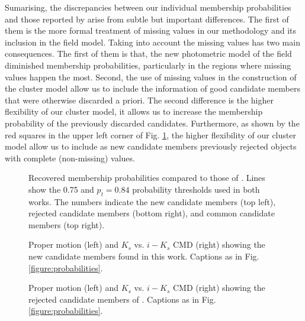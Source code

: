 Sumarising, the discrepancies between our individual membership probabilities and those reported by \citet{Bouy2015} arise from subtle but important differences. The first of them is the more formal treatment of missing values in our methodology and its inclusion in the field model. Taking into account the missing values has two main consequences. The first of them is that, the new photometric model of the field diminished membership probabilities, particularly in the regions where missing values happen the most. Second, the use of missing values in the construction of the cluster model allow us to include the information of good candidate members that were otherwise discarded a priori. The second difference is the higher flexibility of our cluster model, it allows us to increase the membership probability of the previously discarded candidates. Furthermore, as shown by the red squares in the upper left corner of Fig. \ref{figure:HM-SBB}, the higher flexibility of our cluster model allow us to include as new candidate members previously rejected objects with complete (non-missing) values.  

\begin{figure}[htbp]
\begin{center}
\caption{Recovered membership probabilities compared to those of \citet{Bouy2015}. Lines show the 0.75 and $p_t=0.84$ probability thresholds used in both works. The numbers indicate the new candidate members (top left), rejected candidate members (bottom right), and common candidate members (top right).}
\label{figure:HM-SBB}
\end{center}
\end{figure}


 \begin{figure*}[htbp]
\begin{center}
\caption{Proper motion (left) and $K_s$ vs. $i-K_s$ CMD (right) showing the new candidate members found in this work. Captions as in Fig. \ref{figure:probabilities}.}
\label{figure:newones}
\end{center}
\end{figure*}

 \begin{figure*}[htbp]
\begin{center}
\caption{Proper motion (left) and $K_s$ vs. $i-K_s$ CMD (right) showing the rejected candidate members of \citet{Bouy2015}. Captions as in Fig. \ref{figure:probabilities}.}
\label{figure:rejecteds}
\end{center}
\end{figure*}

